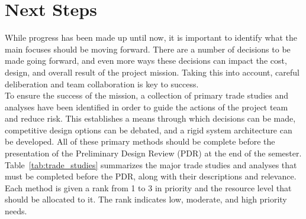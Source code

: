 \documentclass[conf]{new-aiaa}
\begin{document}
\clearpage
\section{Next Steps}

While progress has been made up until now, it is important to identify what the main focuses should be moving forward.
There are a number of decisions to be made going forward, and even more ways these decisions can impact the cost, design, and overall result of the project mission.
Taking this into account, careful deliberation and team collaboration is key to success. \\

To ensure the success of the mission, a collection of primary trade studies and analyses have been identified in order to guide the actions of the project team and reduce risk.
This establishes a means through which decisions can be made, competitive design options can be debated, and a rigid system architecture can be developed.
All of these primary methods should be complete before the presentation of the Preliminary Design Review (PDR) at the end of the semester. \\

Table~\ref{tab:trade_studies} summarizes the major trade studies and analyses that must be completed before the PDR, along with their descriptions and relevance.
Each method is given a rank from 1 to 3 in priority and the resource level that should be allocated to it.
The rank indicates low, moderate, and high priority needs.
\end{document}
